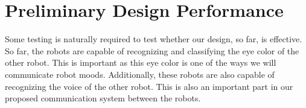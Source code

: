 \chapter{Preliminary Design Performance}
\label{ch:preliminarydesignperformance}

Some testing is naturally required to test whether our design, so far, is effective. So far, the robots are capable of recognizing and classifying the eye color of the other robot. This is important as this eye color is one of the ways we will communicate robot moods. Additionally, these robots are also capable of recognizing the voice of the other robot. This is also an important part in our proposed communication system between the robots. \par
